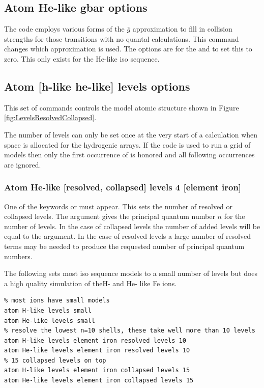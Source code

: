\subsection{Atom He-like gbar options}

The code employs various forms of the $\bar g$
approximation to fill in collision strengths for those transitions with
no quantal calculations.
This command changes which approximation is used.
The options are  for the \citet{Vriens1980} and
 to set this to zero.
This only exists for the He-like iso sequence.

\subsection{Atom [h-like \OR{} he-like] levels options}

This set of commands controls the model atomic structure shown in 
Figure \ref{fig:LevelsResolvedCollapsed}.

The number of levels can only be set once at the very start of a
calculation when space is allocated for the hydrogenic arrays.
If the code
is used to run a grid of models then only the first occurrence of
 is honored and all following occurrences
are ignored.

\subsubsection{Atom He-like [resolved, collapsed] levels 4 [element iron]}

One of the keywords  or  must appear.
This sets the number of resolved or collapsed levels.
The argument gives the principal quantum
number $n$ for the number of levels.
In the case of collapsed levels the number of added levels will be equal to the argument.
In the case of resolved levels a large number of resolved terms may be needed
to produce the requested number of principal quantum numbers.

The following sets most iso sequence models to a small number of levels
but does a high quality simulation of theH- and He- like Fe ions.
\begin{verbatim}
% most ions have small models
atom H-like levels small
atom He-like levels small
% resolve the lowest n=10 shells, these take well more than 10 levels
atom H-like levels element iron resolved levels 10
atom He-like levels element iron resolved levels 10
% 15 collapsed levels on top
atom H-like levels element iron collapsed levels 15
atom He-like levels element iron collapsed levels 15
\end{verbatim}


